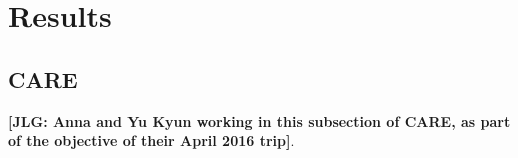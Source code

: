 \section{Results}

\subsection{CARE}

\noindent \textbf{[JLG: Anna and Yu Kyun working in this subsection of CARE, as part of the objective of their April 2016 trip]}.

\renewcommand{\refname}{Appendix References}
\clearpage
\singlespace



 